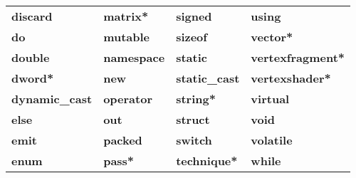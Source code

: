 \documentclass[../main.tex]{subfiles}
\begin{document}
\begin{table}
\begin{tabular}{ p{4cm} p{4cm} p{4cm} p{4cm}  }
\textbf{discard}          & \textbf{matrix*}           & \textbf{signed}              & \textbf{using} \\
\textbf{do}               & \textbf{mutable}           & \textbf{sizeof}              & \textbf{vector*} \\
\textbf{double}           & \textbf{namespace}         & \textbf{static}              & \textbf{vertexfragment*} \\
\textbf{dword*}           & \textbf{new}               & \textbf{static_cast}         & \textbf{vertexshader*} \\
\textbf{dynamic_cast}     & \textbf{operator}          & \textbf{string*}             & \textbf{virtual} \\
\textbf{else}             & \textbf{out}               & \textbf{struct}              & \textbf{void} \\
\textbf{emit}             & \textbf{packed}            & \textbf{switch}              & \textbf{volatile} \\
\textbf{enum}             & \textbf{pass*}             & \textbf{technique*}          & \textbf{while} \\

\end{tabular}
\end{table}
\end{document}

